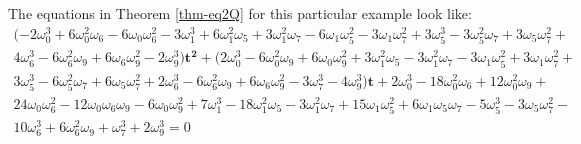 \documentclass[a4paper,10pt]{amsart}
\theoremstyle{plain}
\theoremstyle{definition}
\theoremstyle{remark}
\numberwithin{equation}{section}
\begin{document}
The equations in Theorem \ref{thm-eq2Q} for this particular example look like:
\footnotesize
\begin{gather*}
(-2\omega_{0}^3 + 6\omega_{0}^2\omega_{6} - 6\omega_{0}\omega_{6}^2 - 3\omega_{1}^3 + 6\omega_{1}^2\omega_{5} +
    3\omega_{1}^2\omega_{7} - 6\omega_{1}\omega_{5}^2 - 3\omega_{1}\omega_{7}^2 + 3\omega_{5}^3 - 3\omega_{5}^2\omega_{7} +
    3\omega_{5}\omega_{7}^2 +  \\
4\omega_{6}^3 - 6\omega_{6}^2\omega_{9} + 6\omega_{6}\omega_{9}^2 - 2\omega_{9}^3)\pmb{t^2} + (
    2\omega_{0}^3 - 6\omega_{0}^2\omega_{9} + 6\omega_{0}\omega_{9}^2 + 3\omega_{1}^2\omega_{5} - 3\omega_{1}^2\omega_{7} -
    3\omega_{1}\omega_{5}^2 + 3\omega_{1}\omega_{7}^2 + \\3\omega_{5}^3 - 
6\omega_{5}^2\omega_{7} + 6\omega_{5}\omega_{7}^2 + 2\omega_{6}^3
    - 6\omega_{6}^2\omega_{9} + 6\omega_{6}\omega_{9}^2 - 3\omega_{7}^3 - 4\omega_{9}^3)\boldsymbol{t} + 2\omega_{0}^3 - 18\omega_{0}^2\omega_{6} +
    12\omega_{0}^2\omega_{9} + \\24\omega_{0}\omega_{6}^2 - 12\omega_{0}\omega_{6}\omega_{9} -
 6\omega_{0}\omega_{9}^2 + 7\omega_{1}^3 - 18\omega_{1}^2\omega_{5} -
    3\omega_{1}^2\omega_{7} + 15\omega_{1}\omega_{5}^2 + 6\omega_{1}\omega_{5}\omega_{7} - 5\omega_{5}^3 - 3\omega_{5}\omega_{7}^2 -\\ 10\omega_{6}^3 +
    6\omega_{6}^2\omega_{9} + \omega_{7}^3 + 2\omega_{9}^3=0
\end{gather*}
\end{document}
